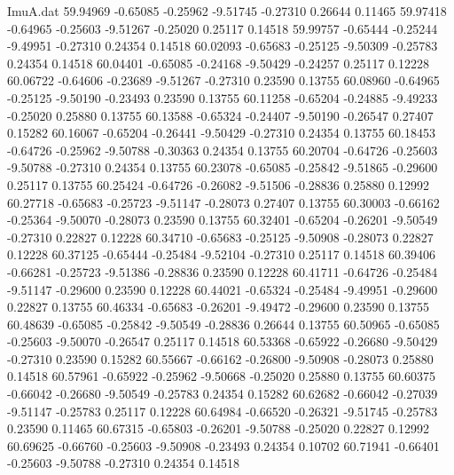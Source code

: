 \begin{filecontents}{ImuA.dat}
  59.94969   -0.65085   -0.25962   -9.51745   -0.27310    0.26644    0.11465
  59.97418   -0.64965   -0.25603   -9.51267   -0.25020    0.25117    0.14518
  59.99757   -0.65444   -0.25244   -9.49951   -0.27310    0.24354    0.14518
  60.02093   -0.65683   -0.25125   -9.50309   -0.25783    0.24354    0.14518
  60.04401   -0.65085   -0.24168   -9.50429   -0.24257    0.25117    0.12228
  60.06722   -0.64606   -0.23689   -9.51267   -0.27310    0.23590    0.13755
  60.08960   -0.64965   -0.25125   -9.50190   -0.23493    0.23590    0.13755
  60.11258   -0.65204   -0.24885   -9.49233   -0.25020    0.25880    0.13755
  60.13588   -0.65324   -0.24407   -9.50190   -0.26547    0.27407    0.15282
  60.16067   -0.65204   -0.26441   -9.50429   -0.27310    0.24354    0.13755
  60.18453   -0.64726   -0.25962   -9.50788   -0.30363    0.24354    0.13755
  60.20704   -0.64726   -0.25603   -9.50788   -0.27310    0.24354    0.13755
  60.23078   -0.65085   -0.25842   -9.51865   -0.29600    0.25117    0.13755
  60.25424   -0.64726   -0.26082   -9.51506   -0.28836    0.25880    0.12992
  60.27718   -0.65683   -0.25723   -9.51147   -0.28073    0.27407    0.13755
  60.30003   -0.66162   -0.25364   -9.50070   -0.28073    0.23590    0.13755
  60.32401   -0.65204   -0.26201   -9.50549   -0.27310    0.22827    0.12228
  60.34710   -0.65683   -0.25125   -9.50908   -0.28073    0.22827    0.12228
  60.37125   -0.65444   -0.25484   -9.52104   -0.27310    0.25117    0.14518
  60.39406   -0.66281   -0.25723   -9.51386   -0.28836    0.23590    0.12228
  60.41711   -0.64726   -0.25484   -9.51147   -0.29600    0.23590    0.12228
  60.44021   -0.65324   -0.25484   -9.49951   -0.29600    0.22827    0.13755
  60.46334   -0.65683   -0.26201   -9.49472   -0.29600    0.23590    0.13755
  60.48639   -0.65085   -0.25842   -9.50549   -0.28836    0.26644    0.13755
  60.50965   -0.65085   -0.25603   -9.50070   -0.26547    0.25117    0.14518
  60.53368   -0.65922   -0.26680   -9.50429   -0.27310    0.23590    0.15282
  60.55667   -0.66162   -0.26800   -9.50908   -0.28073    0.25880    0.14518
  60.57961   -0.65922   -0.25962   -9.50668   -0.25020    0.25880    0.13755
  60.60375   -0.66042   -0.26680   -9.50549   -0.25783    0.24354    0.15282
  60.62682   -0.66042   -0.27039   -9.51147   -0.25783    0.25117    0.12228
  60.64984   -0.66520   -0.26321   -9.51745   -0.25783    0.23590    0.11465
  60.67315   -0.65803   -0.26201   -9.50788   -0.25020    0.22827    0.12992
  60.69625   -0.66760   -0.25603   -9.50908   -0.23493    0.24354    0.10702
  60.71941   -0.66401   -0.25603   -9.50788   -0.27310    0.24354    0.14518

\end{filecontents}
